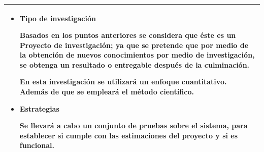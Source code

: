 \documentclass[letter,12pt]{article}
\begin{document}
\begin{center}
\begin{tabular}{|p{15.5cm}|}
\hline
    
    \begin{itemize}
        
        \item Tipo de investigación
        
        Basados en los puntos anteriores se considera que éste es un Proyecto de investigación; ya que se pretende que por medio de la obtención de nuevos conocimientos por medio de investigación, se obtenga un resultado o entregable después de la culminación. 
    
        En esta investigación se utilizará un enfoque cuantitativo. Además de que se empleará el método científico.
        
        \item Estrategias
        
        Se llevará a cabo un conjunto de pruebas sobre el sistema, para establecer si cumple con las estimaciones del proyecto y si es funcional.
    \end{itemize}\\  

\hline
\end{tabular}
\end{center}

\end{document}
